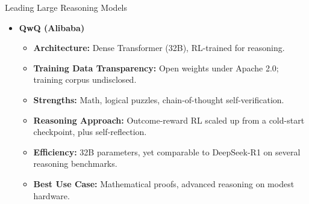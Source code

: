 \begin{frame}[allowframebreaks]{Leading Large Reasoning Models}
\begin{itemize}
\begin{itemize}
            \item \textbf{Strengths:} Reasoning traces that stay in the user's own language across scripts and alphabets.
            \item \textbf{Reasoning Approach:} RL-trained chains of thought, kept legible for review.
            \item \textbf{Efficiency:} 24B open-weight variant, self-hostable.
            \item \textbf{Best Use Case:} Regulated or multilingual settings where the trace must be auditable.
        \end{itemize}
    \framebreak
        \item \textbf{QwQ (Alibaba)}
        \begin{itemize}
            \item \textbf{Architecture:} Dense Transformer (32B), RL-trained for reasoning.
            \item \textbf{Training Data Transparency:} Open weights under Apache 2.0; training corpus undisclosed.
            \item \textbf{Strengths:} Math, logical puzzles, chain-of-thought self-verification.
            \item \textbf{Reasoning Approach:} Outcome-reward RL scaled up from a cold-start checkpoint, plus self-reflection.
            \item \textbf{Efficiency:} 32B parameters, yet comparable to DeepSeek-R1 on several reasoning benchmarks.
            \item \textbf{Best Use Case:} Mathematical proofs, advanced reasoning on modest hardware.
        \end{itemize}
    \end{itemize}
\end{frame}
